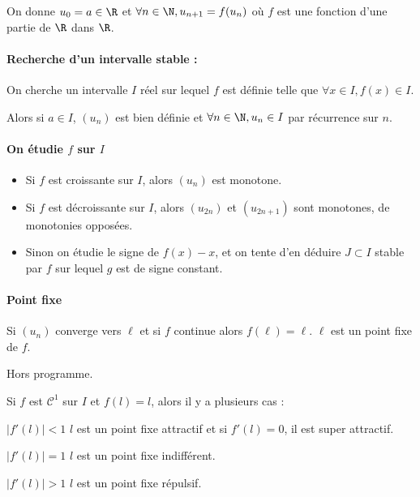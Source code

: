 On donne $u_0 = a \in \R$ et $\forall n \in \N, u_{n + 1} = f(u_n)$ où $f$ est une fonction 
d'une partie de $\R$ dans $\R$.

\paragraph{Recherche d'un intervalle stable :}

On cherche un intervalle $I$ réel sur lequel $f$ est définie
telle que $\forall x \in I, f(x) \in I$.

Alors si $a \in I$, $(u_n)$ est bien définie et $\forall n \in \N, u_n \in I$ par récurrence 
sur $n$. 

\paragraph{On étudie $f$ sur $I$}

\begin{itemize}
    \item Si $f$ est croissante sur $I$, alors $(u_n)$ est monotone.
    \item Si $f$ est décroissante sur $I$, alors $(u_{2n})$ et $(u_{2n + 1})$ sont monotones, de 
        monotonies opposées.
    \item Sinon on étudie le signe de $f(x) - x$, et on tente d'en déduire $J \subset I$ stable
        par $f$ sur lequel $g$ est de signe constant. 
\end{itemize}

\paragraph{Point fixe}

Si $(u_n)$ converge vers $\ell$ et si $f$ continue alors $f(\ell) = \ell$. $\ell$ est un point fixe de $f$. \\

\begin{remarque}
    Hors programme. 

    Si $f$ est $\mathscr C^1$ sur $I$ et $f(l) = l$, alors il y a plusieurs cas : 

    \qquad \uline{$|f'(l)| < 1$}
    \avspace $l$ est un point fixe attractif et si $f'(l) = 0$, il est super attractif. 

    \avspace \qquad \uline{$|f'(l)| = 1$}
    \avspace $l$ est un point fixe indifférent. 

    \avspace \qquad \uline{$|f'(l)| > 1$}
    \avspace $l$ est un point fixe répulsif.
\end{remarque}

